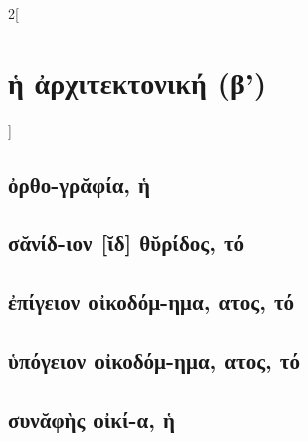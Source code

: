 \documentclass{book}
\begin{document}
\begin{multicols}{2}[\section{ἡ ἀρχιτεκτονική (β')}]
\subsection{ὀρθο-γρᾰφία, ἡ}
\subsection{σᾰνίδ-ιον [ῐδ] θῠρίδος, τό}
\subsection{ἐπίγειον οἰκοδόμ-ημα, ατος, τό}
\subsection{ὑπόγειον οἰκοδόμ-ημα, ατος, τό}
\subsection{συνᾰφὴς οἰκί-α, ἡ}
~
\end{multicols}
\newpage  
\end{document}
